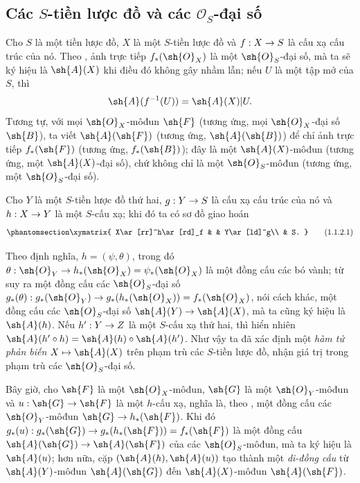 \documentclass[oneside,10pt]{amsart}
\makeatletter
\newcommand{\ega@arrow}[2]{\mathchoice{#1}{#2}{#2}{#2}}
\let\ega@shortmapsto\mapsto
\renewcommand{\to}{\ega@arrow{\longrightarrow}{\rightarrow}}
\renewcommand{\mapsto}{\ega@arrow{\longmapsto}{\ega@shortmapsto}}
\newcommand{\oldpage}[2][]{\marginnote{\normalfont\footnotesize\textbf{#1}~|~#2}\ignorespaces}
\let\EGAOriginalLabel\label
\renewcommand{\label}[1]{\phantomsection\EGAOriginalLabel{#1}}
\makeatother
\begin{document}
\subsection{Các $S$-tiền lược đồ và các $\mathcal{O}_S$-đại số}
\label{subsection:II.1.1}

\begin{env}[1.1.1]
\label{II.1.1.1}
Cho $S$ là một tiền lược đồ, $X$ là một $S$-tiền lược đồ và $f:X\to S$ là cấu xạ cấu trúc của nó.
Theo , ảnh trực tiếp $f_*(\sh{O}_X)$ là một $\sh{O}_S$-đại số, mà ta sẽ
\oldpage[II]{6}
ký hiệu là $\sh{A}(X)$ khi điều đó không gây nhầm lẫn; nếu $U$ là một tập mở của $S$, thì
\[
  \sh{A}(f^{-1}(U))=\sh{A}(X)|U.
\]
Tương tự, với mọi $\sh{O}_X$-môđun $\sh{F}$ (tương ứng, mọi $\sh{O}_X$-đại số $\sh{B}$), ta viết $\sh{A}(\sh{F})$ (tương ứng, $\sh{A}(\sh{B})$) để chỉ ảnh trực tiếp $f_*(\sh{F})$ (tương ứng, $f_*(\sh{B})$); đây là một $\sh{A}(X)$-môđun (tương ứng, một $\sh{A}(X)$-đại số), chứ không chỉ là một $\sh{O}_S$-môđun (tương ứng, một $\sh{O}_S$-đại số).
\end{env}

\begin{env}[1.1.2]
\label{II.1.1.2}
Cho $Y$ là một $S$-tiền lược đồ thứ hai, $g:Y\to S$ là cấu xạ cấu trúc của nó và $h:X\to Y$ là một $S$-cấu xạ; khi đó ta có sơ đồ giao hoán
\[
\label{II.1.1.2.1}
  \xymatrix{
    X\ar[rr]^h\ar[rd]_f & &
    Y\ar[ld]^g\\
    & S.
  }
  \tag{1.1.2.1}
\]

Theo định nghĩa, $h=(\psi,\theta)$, trong đó $\theta:\sh{O}_Y\to h_*(\sh{O}_X)=\psi_*(\sh{O}_X)$ là một đồng cấu các bó vành; từ  suy ra một đồng cấu các $\sh{O}_S$-đại số $g_*(\theta):g_*(\sh{O}_Y)\to g_*(h_*(\sh{O}_X))=f_*(\sh{O}_X)$, nói cách khác, một đồng cấu các $\sh{O}_S$-đại số $\sh{A}(Y)\to\sh{A}(X)$, mà ta cũng ký hiệu là $\sh{A}(h)$.
Nếu $h':Y\to Z$ là một $S$-cấu xạ thứ hai, thì hiển nhiên $\sh{A}(h'\circ h)=\sh{A}(h)\circ\sh{A}(h')$.
Như vậy ta đã xác định một \emph{hàm tử phản biến $X\mapsto\sh{A}(X)$} trên phạm trù các $S$-tiền lược đồ, nhận giá trị trong phạm trù các $\sh{O}_S$-đại số.

Bây giờ, cho $\sh{F}$ là một $\sh{O}_X$-môđun, $\sh{G}$ là một $\sh{O}_Y$-môđun và $u:\sh{G}\to\sh{F}$ là một $h$-cấu xạ, nghĩa là, theo , một đồng cấu các $\sh{O}_Y$-môđun $\sh{G}\to h_*(\sh{F})$.
Khi đó $g_*(u):g_*(\sh{G})\to g_*(h_*(\sh{F}))=f_*(\sh{F})$ là một đồng cấu $\sh{A}(\sh{G})\to\sh{A}(\sh{F})$ của các $\sh{O}_S$-môđun, mà ta ký hiệu là $\sh{A}(u)$; hơn nữa, cặp $(\sh{A}(h),\sh{A}(u))$ tạo thành một \emph{di-đồng cấu} từ $\sh{A}(Y)$-môđun $\sh{A}(\sh{G})$ đến $\sh{A}(X)$-môđun $\sh{A}(\sh{F})$.
\end{env}
\end{document}

